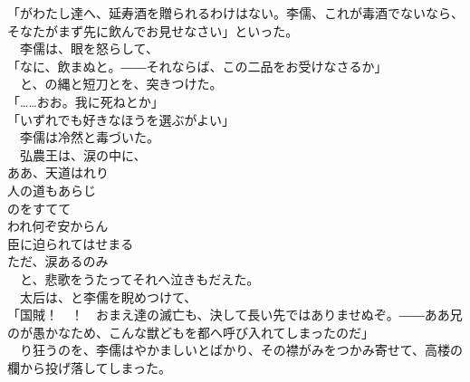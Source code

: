 \documentclass[
  paper=a5,
  fontsize=10pt,
  jafontsize=9.5pt,
  tate,                  %
  open_bracket_pos=nibu, %
]{jlreq}
\begin{document}
「がわたし達へ、延寿酒を贈られるわけはない。李儒、これが毒酒でないなら、そなたがまず先に飲んでお見せなさい」といった。\\


　李儒は、眼を怒らして、\\


「なに、飲まぬと。――それならば、この二品をお受けなさるか」\\


　と、の縄と短刀とを、突きつけた。\\


「……おお。我に死ねとか」\\


「いずれでも好きなほうを選ぶがよい」\\


　李儒は冷然と毒づいた。\\


　弘農王は、涙の中に、\\



ああ、天道はれり\\


人の道もあらじ\\

のをすてて\\


われ何ぞ安からん\\


臣に迫られてはせまる\\


ただ、涙あるのみ\\



　と、悲歌をうたってそれへ泣きもだえた。\\


　太后は、と李儒を睨めつけて、\\


「国賊！　！　おまえ達の滅亡も、決して長い先ではありませぬぞ。――ああ兄のが愚かなため、こんな獣どもを都へ呼び入れてしまったのだ」\\


　り狂うのを、李儒はやかましいとばかり、その襟がみをつかみ寄せて、高楼の欄から投げ落してしまった。\\

\\
\end{document}
